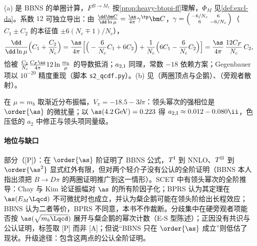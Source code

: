 \begin{proofsketch}
(a) 是 BBNS 的单圈计算\cite[式~(46)--(48)]{BenekeEtAl2001}，$F^{B\to M_1}$ 按\cref{prop:heavy-btopi-ff}理解，$\Phi_M$ 见\cref{def:excl-da}。系数 $12$ 可独立导出：由 $\frac{\dd\bm C}{\dd\ln\mu}=\frac{\as}{4\pi}\gamma^{\tp}\bm C$，$\gamma=\begin{psmallmatrix}-6/N_c&6\\6&-6/N_c\end{psmallmatrix}$（$C_1\pm C_2$ 的本征值 $\pm6(N_c\mp1)/N_c$），
\begin{equation}\label{eq:heavy-a1-rg}
\frac{\dd}{\dd\ln\mu}\Big(C_1+\frac{C_2}{N_c}\Big)=\frac{\as}{4\pi}\Big[\Big(-\frac{6}{N_c}C_1+6C_2\Big)+\frac1{N_c}\Big(6C_1-\frac6{N_c}C_2\Big)\Big]=\frac{\as}{4\pi}\,\frac{12C_F}{N_c}\,C_2 ,
\end{equation}
恰被 $\frac{C_2}{N_c}\frac{C_F\as}{4\pi}12\ln\frac{m_b}{\mu}$ 的导数抵消；$a_{2,\rm I}$ 同理，常数 $-18$ 依赖方案；Gegenbauer 项以 $10^{-20}$ 精度重现（脚本 \texttt{s2\_\allowbreak qcdf.py}）。(b) 见\cite{Bell:2007tv,Bell:2009nk,Beneke:2009ek,Bell:2015koa,Bell:2020qus}（两圈顶点与企鹅）、\cite{Beneke:2005vv,Beneke:2006mk,Kivel:2006xc,Pilipp:2007mg,Beneke:2005gs}（旁观者散射）。
\end{proofsketch}

在 $\mu=m_b$ 取渐近分布振幅，$V_\pi=-18.5-3\ii\pi$：领头幂次的强相位是 $\order{\as}$ 的微扰量；以 $\as(4.2\,{\rm GeV})=0.223$ 得 $a_{2,\rm I}\approx0.012-0.080\ii$，色压低的 $a_2$ 中修正与领头项同量级。

\paragraph{地位与缺口}
部分（[P]）：在 $\order{\as}$ 阶证明了 BBNS 公式，$T^{\rm I}$ 到 NNLO、$T^{\rm II}$ 到 $\order{\as^2}$ 显式红外有限，但对两个轻介子没有公认的全阶证明（BBNS 本人指出须把 $B\to D\pi$ 的两圈证明推广到这一情形\cite[第~8~节]{BenekeEtAl2000}）。SCET 中有领头幂次的全阶推导：Chay 与 Kim 论证振幅对 $\as$ 的所有阶因子化\cite{Chay:2003ju}；BPRS 认为其定理在 $\as(E_M\Lqcd)$ 不可微扰时也成立，并认为粲企鹅可能在领头阶给出长程效应\cite{Bauer:2004tj}；BBNS 认为二者等价\cite{Beneke:2004bn}，BPRS 不同意\cite{Bauer:2005wb}，本书不作裁断。分歧集中在硬旁观者项能否按 $\as(\sqrt{m_b\Lqcd})$ 展开与粲企鹅的幂次计数（E-S 型陈述）；正因没有共识与公认证明，标签取 [P] 而非 [A]；但说“BBNS 只在 $\order{\as}$ 成立”则低估了现状。升级途径：包含这两点的公认全阶证明。

